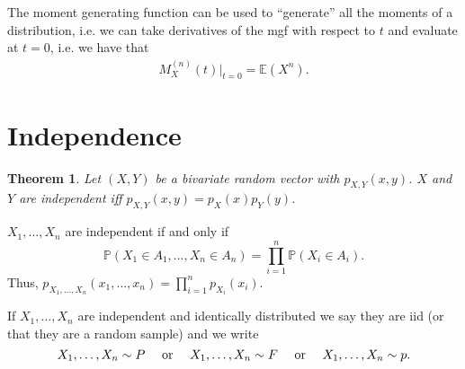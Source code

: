 \documentclass[twoside,12pt]{article}
\newcounter{lecnum}
\newtheorem{theorem}{Theorem}[lecnum]
\begin{document}
\vspace{1cm}





\vspace{1cm}

The moment generating function can be used to ``generate'' all the moments of a distribution, i.e.
we can take derivatives of the mgf with respect to $t$ and evaluate at $t = 0$, i.e. we have that
\begin{align*}
M^{(n)}_X(t)|_{t=0} = \mathbb{E}\left(X^n\right).
\end{align*}

\section{Independence}


\begin{theorem}
Let $(X,Y)$ be a bivariate random vector with $p_{X,Y}(x,y)$.  $X$ and $Y$ 
are independent iff 
$p_{X,Y}(x,y)=p_X(x)p_Y(y)$.
\end{theorem}

$X_1,\ldots, X_n$ are independent if and only if
$$
\mathbb{P}(X_1\in A_1, \ldots, X_n \in A_n) =
\prod_{i=1}^n \mathbb{P}(X_i\in A_i).
$$
Thus,
$p_{X_1,\ldots,X_n} (x_1,\ldots, x_n)= \prod_{i=1}^n p_{X_i}(x_i)$.

If $X_1,\ldots, X_n$ are independent and identically distributed
we say they are iid (or that they are a random sample) and we write
$$
X_1,\ldots, X_n \sim P
\ \ \ \ {\rm or}\ \ \ \ 
X_1,\ldots, X_n \sim F
\ \ \ \ {\rm or}\ \ \ \ 
X_1,\ldots, X_n \sim p.
$$
\end{document}
